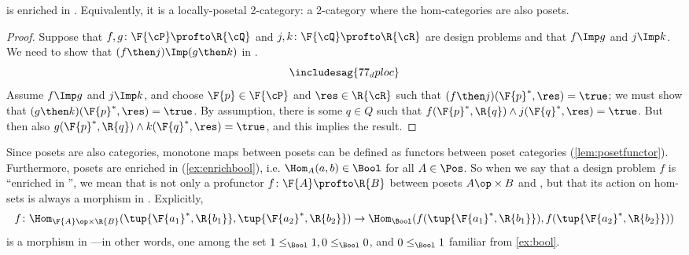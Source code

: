 \begin{proposition}
    \label{prop:DP_loc_pos}
    \DP is enriched in \Pos. Equivalently, it is a locally-posetal 2-category: a 2-category where the hom-categories are also posets.
\end{proposition}
\begin{proof}
    Suppose that $f,g\colon \F{\cP} \profto \R{\cQ}$ and $j,k\colon \F{\cQ} \profto \R{\cR}$ are design problems and that $f\Imp g$ and $j\Imp k$. We need to show that $(f\then j)\Imp(g\then k)$ in \DP.
    \begin{equation*}
        \includesag{77_dploc}
    \end{equation*}
    Assume $f\Imp g$ and $j\Imp k$, and choose $\F{p}\in\F{\cP} $ and $\res\in\R{\cR}$ such that $(f\then j)(\F{p}^*,\res)=\true$; we must show that $(g \then k)(\F{p}^*,\res)=\true$. By assumption, there is some $q\in Q$ such that $f(\F{p}^*,\R{q})\wedge j(\F{q}^*,\res)=\true$. But then also $g(\F{p}^*,\R{q})\wedge k(\F{q}^*,\res)=\true$, and this implies the result.
\end{proof}

Since posets are also categories, monotone maps between posets can be defined as functors between poset categories (\cref{lem:posetfunctor}). Furthermore, posets are enriched in \Bool (\cref{ex:enrichbool}), i.e. $\Hom_A(a,b) \in \Bool$ for all $A \in \Pos$. So when we say that a design problem $f$ is ``enriched in \Bool'', we mean that is not only a profunctor $f \colon \F{A} \profto \R{B}$ between posets $A\op \times B$ and \Bool, but that its action on hom-sets is always a morphism in \Bool. Explicitly,
\begin{equation*}
    f \colon \Hom_{\F{A}\op \times \R{B}}(\tup{\F{a_1}^*,\R{b_1}}, \tup{\F{a_2}^*,\R{b_2}}) \to \Hom_\Bool(f(\tup{\F{a_1}^*,\R{b_1}}), f(\tup{\F{a_2}^*,\R{b_2}}))
\end{equation*}
is a morphism in \Bool---in other words, one among the set $1 \leq_\Bool 1, 0 \leq_\Bool 0$, and $0 \leq_\Bool 1$ familiar from \cref{ex:bool}.

